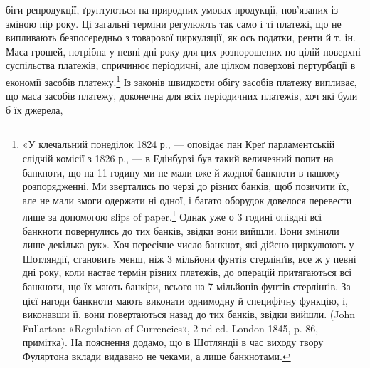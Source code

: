 біги репродукції, ґрунтуються на природних умовах продукції,
пов’язаних із зміною пір року. Ці загальні терміни регулюють
так само і ті платежі, що не випливають безпосередньо з товарової
циркуляції, як ось податки, ренти й т. ін. Маса грошей, потрібна
у певні дні року для цих розпорошених по цілій поверхні суспільства
платежів, спричинює періодичні, але цілком поверхові пертурбації
в економії засобів платежу.\footnote{
«У клечальний понеділок 1824 р., — оповідає пан Креґ парламентській
слідчій комісії з 1826 р., — в Едінбурзі був такий величезний попит
на банкноти, що на 11 годину ми не мали вже й жодної банкноти в нашому
розпорядженні. Ми звертались по черзі до різних банків, щоб позичити
їх, але не мали змоги одержати ні одної, і багато оборудок довелося перевести
лише за допомогою slips of paper.\footnote*{
— шматків паперу. \emph{Ред.}
} Однак уже о 3 годині опівдні
всі банкноти повернулись до тих банків, звідки вони вийшли. Вони змінили
лише декілька рук». Хоч пересічне число банкнот, які дійсно циркулюють
у Шотляндії, становить менш, ніж 3 мільйони фунтів стерлінґів,
все ж у певні дні року, коли настає термін різних платежів, до операцій
притягаються всі банкноти, що їх мають банкіри, всього на 7 мільйонів
фунтів стерлінґів. За цієї нагоди банкноти мають виконати однимодну
й специфічну функцію, і, виконавши її, вони повертаються назад
до тих банків, звідки вийшли. (John Fullarton: «Regulation of Currencies»,
2 nd ed. London 1845, p. 86, примітка). На пояснення додамо, що в Шотляндії
в час виходу твору Фуляртона вклади видавано не чеками, а лише
банкнотами.
} Із законів швидкости
обігу засобів платежу випливає, що маса засобів платежу, доконечна
для всіх періодичних платежів, хоч які були б їх джерела,
